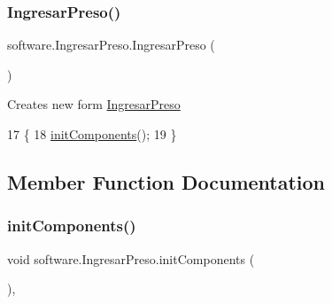 \subsubsection{\texorpdfstring{Ingresar\+Preso()}{IngresarPreso()}}
{\footnotesize\ttfamily software.\+Ingresar\+Preso.\+Ingresar\+Preso (\begin{DoxyParamCaption}{ }\end{DoxyParamCaption})\hspace{0.3cm}{\ttfamily [inline]}}

Creates new form \mbox{\hyperlink{classsoftware_1_1_ingresar_preso}{Ingresar\+Preso}} 
\begin{DoxyCode}
17                            \{
18         \mbox{\hyperlink{classsoftware_1_1_ingresar_preso_a0c56fe65b6f37cd014a9b9c19ce479b7}{initComponents}}();
19     \}
\end{DoxyCode}


\subsection{Member Function Documentation}
\mbox{\label{classsoftware_1_1_ingresar_preso_a0c56fe65b6f37cd014a9b9c19ce479b7}} 
\subsubsection{\texorpdfstring{init\+Components()}{initComponents()}}
{\footnotesize\ttfamily void software.\+Ingresar\+Preso.\+init\+Components (\begin{DoxyParamCaption}{ }\end{DoxyParamCaption})\hspace{0.3cm}{\ttfamily [inline]}, {\ttfamily [private]}}

